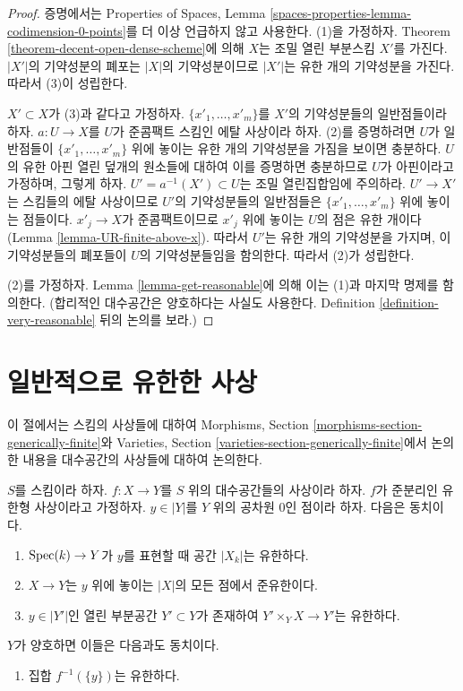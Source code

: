 \begin{proof}
증명에서는 Properties of Spaces, Lemma
\ref{spaces-properties-lemma-codimension-0-points}를 더 이상
언급하지 않고 사용한다.
(1)을 가정하자. Theorem \ref{theorem-decent-open-dense-scheme}에 의해
$X$는 조밀 열린 부분스킴 $X'$를 가진다. $|X'|$의 기약성분의 폐포는
$|X|$의 기약성분이므로 $|X'|$는 유한 개의 기약성분을 가진다.
따라서 (3)이 성립한다.

\medskip\noindent
$X' \subset X$가 (3)과 같다고 가정하자.
$\{x'_1, \ldots, x'_m\}$를 $X'$의 기약성분들의 일반점들이라 하자.
$a : U \to X$를 $U$가 준콤팩트 스킴인 에탈 사상이라 하자.
(2)를 증명하려면 $U$가 일반점들이
$\{x'_1, \ldots, x'_m\}$ 위에 놓이는 유한 개의 기약성분을 가짐을
보이면 충분하다. $U$의 유한 아핀 열린 덮개의 원소들에 대하여 이를
증명하면 충분하므로 $U$가 아핀이라고 가정하며, 그렇게 하자.
$U' = a^{-1}(X') \subset U$는 조밀 열린집합임에 주의하라.
$U' \to X'$는 스킴들의 에탈 사상이므로 $U'$의 기약성분들의 일반점들은
$\{x'_1, \ldots, x'_m\}$ 위에 놓이는 점들이다.
$x'_j \to X$가 준콤팩트이므로 $x'_j$ 위에 놓이는 $U$의 점은 유한
개이다(Lemma \ref{lemma-UR-finite-above-x}). 따라서 $U'$는 유한 개의
기약성분을 가지며, 이 기약성분들의 폐포들이 $U$의 기약성분들임을
함의한다. 따라서 (2)가 성립한다.

\medskip\noindent
(2)를 가정하자. Lemma \ref{lemma-get-reasonable}에 의해 이는 (1)과
마지막 명제를 함의한다.
(합리적인 대수공간은 양호하다는 사실도 사용한다. Definition
\ref{definition-very-reasonable} 뒤의 논의를 보라.)
\end{proof}

\section{일반적으로 유한한 사상}
\label{section-generically-finite}

\noindent
이 절에서는 스킴의 사상들에 대하여 Morphisms, Section
\ref{morphisms-section-generically-finite}와 Varieties, Section
\ref{varieties-section-generically-finite}에서 논의한 내용을 대수공간의
사상들에 대하여 논의한다.

\begin{lemma}
\label{lemma-generically-finite}
$S$를 스킴이라 하자. $f : X \to Y$를 $S$ 위의 대수공간들의
사상이라 하자. $f$가 준분리인 유한형 사상이라고 가정하자.
$y \in |Y|$를 $Y$ 위의 공차원 $0$인 점이라 하자.
다음은 동치이다.
\begin{enumerate}
\item $\mathop{\mathrm{Spec}}(k) \to Y$가 $y$를 표현할 때 공간 $|X_k|$는 유한하다.
\item $X \to Y$는 $y$ 위에 놓이는 $|X|$의 모든 점에서 준유한이다.
\item $y \in |Y'|$인 열린 부분공간 $Y' \subset Y$가 존재하여
$Y' \times_Y X \to Y'$는 유한하다.
\end{enumerate}
$Y$가 양호하면 이들은 다음과도 동치이다.
\begin{enumerate}
\item[(4)] 집합 $f^{-1}(\{y\})$는 유한하다.
\end{enumerate}
\end{lemma}

